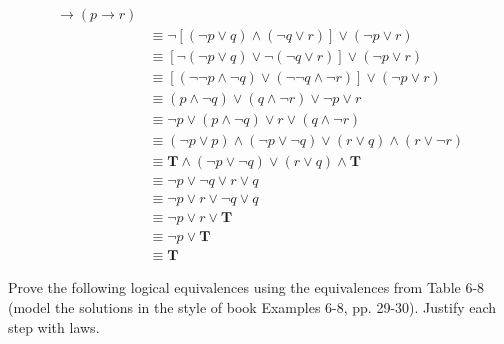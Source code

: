 \documentclass[12pt,addpoints]{exam}
\begin{document}
\begin{questions}
\begin{solution}
    \begin{align*}
    [(p \rightarrow q) &\wedge (q \rightarrow r)] \rightarrow (p \rightarrow r) \\
     & \equiv \neg [ (\neg p \vee q) \wedge (\neg q \vee r)] \vee (\neg p \vee r) \tag{Table 7, rule 1, x4}\\
     & \equiv [\neg (\neg p \vee q) \vee \neg (\neg q \vee r)] \vee (\neg p \vee r) \tag{DeMorgan's} \\
     & \equiv [(\neg \neg p \wedge \neg q) \vee (\neg \neg q \wedge \neg r)] \vee (\neg p \vee r) \tag{DeMorgan's, x2} \\
     & \equiv (p \wedge \neg q) \vee (q \wedge \neg r) \vee \neg p \vee r \tag{Double Negation, x2} \\
     & \equiv \neg p \vee (p \wedge \neg q) \vee r \vee (q \wedge \neg r) \tag{Commutative} \\
     & \equiv (\neg p \vee p) \wedge (\neg p \vee \neg q) \vee (r \vee q) \wedge (r \vee \neg r) \tag{Distributive, x2} \\
     & \equiv \mathbf{T} \wedge (\neg p \vee \neg q) \vee (r \vee q) \wedge \mathbf{T} \tag{Negation, x2} \\
     & \equiv \neg p \vee \neg q \vee r \vee q \tag{Identity, x2} \\
     & \equiv \neg p \vee r \vee \neg q \vee q \tag{Commutative} \\
     & \equiv \neg p \vee r \vee \mathbf{T} \tag{Negation} \\
     & \equiv \neg p \vee \mathbf{T} \tag{Domination} \\
     & \equiv \mathbf{T} \tag{Domination}
     \end{align*}
    \end{solution}


\question Prove the following logical equivalences using the
equivalences from Table 6-8 (model the solutions in the style of
book Examples 6-8, pp. 29-30).  Justify each step with laws.
    \begin{solution}
    \begin{parts}

\end{parts}
\end{solution}
\end{questions}
\end{document}
